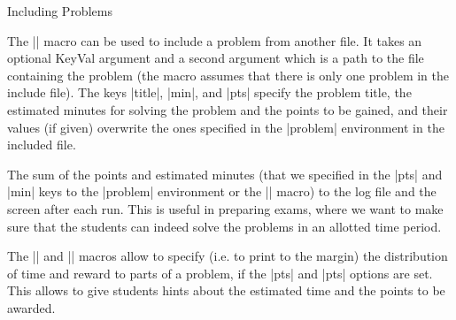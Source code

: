 \begin{sfragment}{Including Problems}
\begin{function}{}
  The || macro can be used to include a problem from another file. It takes
  an optional KeyVal argument and a second argument which is a path to the file containing
  the problem (the macro assumes that there is only one problem in the include file). The
  keys |title|, |min|, and |pts| specify the problem title, the estimated minutes for
  solving the problem and the points to be gained, and their values (if given) overwrite
  the ones specified in the |problem| environment in the included file.
\end{function}

The sum of the points and estimated minutes (that we specified in the |pts| and |min| keys
to the |problem| environment or the || macro) to the log file and the
screen after each run. This is useful in preparing exams, where we want to make sure that
the students can indeed solve the problems in an allotted time period.

The |\min| and |\pts| macros allow to specify (i.e. to print to the margin) the
distribution of time and reward to parts of a problem, if the |pts| and |pts| options are
set. This allows to give students hints about the estimated time and the points to be
awarded.
\end{sfragment}


